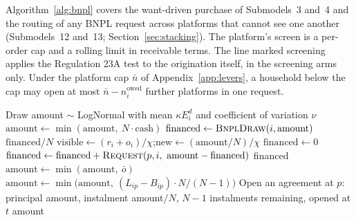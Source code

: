 Algorithm~\ref{alg:bnpl} covers the want-driven purchase of Submodels~3 and~4 and the routing
of any \ac{BNPL} request across platforms that cannot see one another (Submodels~12 and~13;
Section~\ref{sec:stacking}). The platform's screen is a per-order cap and a rolling limit in
receivable terms. The line marked screening applies the Regulation 23A test to the origination
itself, in the screening arms only. Under the platform cap $\bar n$ of Appendix~\ref{app:levers},
a household below the cap may open at most $\bar n - n^{\text{owed}}_i$ further platforms in one
request.

\begin{algorithm}[!htbp]
\caption{\ac{BNPL} origination and platform routing}
\label{alg:bnpl}
\begin{algorithmic}
 
    \State Draw amount $\sim$ LogNormal with mean $\kappa E^d_i$ and coefficient of variation $\nu$
    \State $\text{amount} \gets \min(\text{amount},\ N \cdot \text{cash})$ 
    \State $\text{financed} \gets \Call{BnplDraw}{i, \text{amount}}$
    \State \Return $\text{financed} / N$
\EndFunction
\Statex
{} 
     
        \State $\text{visible} \gets (r_i + o_i) / \chi$;\quad $\text{new} \gets (\text{amount} / N) / \chi$
    \EndIf
    \State $\text{financed} \gets 0$
        \State $\text{financed} \gets \text{financed} + \Call{Request}{p, i,\ \text{amount} - \text{financed}}$
    \EndFor
    \State \Return financed
\EndFunction
\Statex
{}
    \State $\text{amount} \gets \min(\text{amount},\ \bar o)$ 
    \State $\text{amount} \gets \min\bigl(\text{amount},\ (L_{ip} - B_{ip}) \cdot N / (N - 1)\bigr)$
    \State Open an agreement at $p$: principal amount, instalment amount$/N$, $N - 1$ instalments remaining, opened at $t$
    \State \Return amount
\EndFunction
\end{algorithmic}
\end{algorithm}

